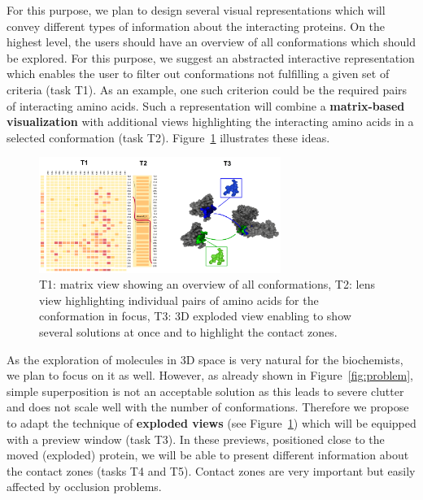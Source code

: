\documentclass[11pt,a4paper,titlepage,oneside,onecolumn]{article}
\begin{document}
For this purpose, we plan to design several visual representations which will convey different types of information about the interacting proteins.
On the highest level, the users should have an overview of all conformations which should be explored. 
For this purpose, we suggest an abstracted interactive representation which enables the user to filter out conformations not fulfilling a given set of criteria (task T1).
As an example, one such criterion could be the required pairs of interacting amino acids. 
Such a representation will combine a \textbf{matrix-based visualization} with additional views highlighting the interacting amino acids in a selected conformation (task T2).
Figure~\ref{fig:matrix} illustrates these ideas. 

\begin{figure}[ht]
\centering
\includegraphics[width=0.7\textwidth]{pics/matrix.png}
\caption{T1: matrix view showing an overview of all conformations, T2: lens view highlighting individual pairs of amino acids for the conformation in focus, T3: 3D exploded view enabling to show several solutions at once and to highlight the contact zones.}
\label{fig:matrix}
\end{figure}

As the exploration of molecules in 3D space is very natural for the biochemists, we plan to focus on it as well.
However, as already shown in Figure~\ref{fig:problem}, simple superposition is not an acceptable solution as this leads to severe clutter and does not scale well with the number of conformations.
Therefore we propose to adapt the technique of \textbf{exploded views} (see Figure~\ref{fig:matrix}) which will be equipped with a preview window (task T3).
In these previews, positioned close to the moved (exploded) protein, we will be able to present different information about the contact zones (tasks T4 and T5).
Contact zones are very important but easily affected by occlusion problems.
\end{document}
